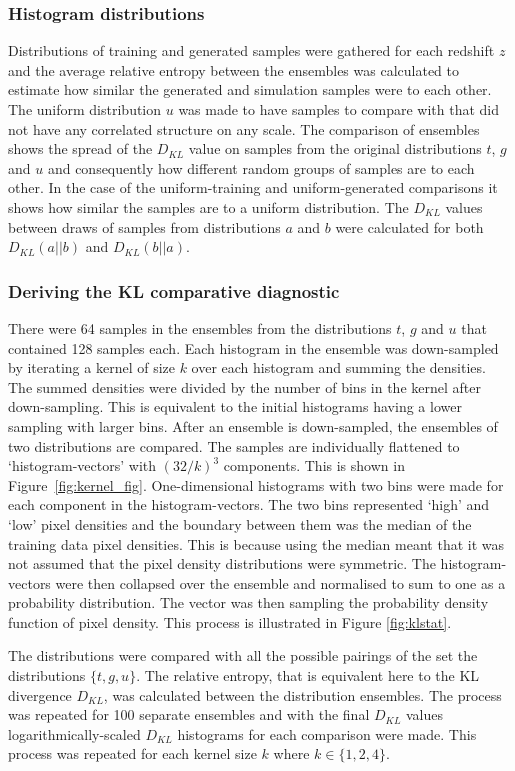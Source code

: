 \documentclass[twocolumn]{article}
\numberwithin{equation}{section}
\begin{document}
\subsubsection{Histogram distributions}
Distributions of training and generated samples were gathered for each redshift $z$ and the average relative entropy between the ensembles was calculated to estimate how similar the generated and simulation samples were to each other. The uniform distribution $u$ was made to have samples to compare with that did not have any correlated structure on any scale. The comparison of ensembles shows the spread of the $D_{KL}$ value on samples from the original distributions $t$, $g$ and $u$ and consequently how different random groups of samples are to each other. In the case of the uniform-training and uniform-generated comparisons it shows how similar the samples are to a uniform distribution. The $D_{KL}$ values between draws of samples from distributions $a$ and $b$ were calculated for both $D_{KL}(a||b)$ and $D_{KL}(b||a)$. 

\subsubsection{Deriving the KL comparative diagnostic}
There were 64 samples in the ensembles from the distributions $t$, $g$ and $u$ that contained 128 samples each. Each histogram in the ensemble was down-sampled by iterating a kernel of size $k$ over each histogram and summing the densities. The summed densities were divided by the number of bins in the kernel after down-sampling. This is equivalent to the initial histograms having a lower sampling with larger bins. After an ensemble is down-sampled, the ensembles of two distributions are compared. The samples are individually flattened to `histogram-vectors' with $(32/k)^3$ components. This is shown in Figure~\ref{fig:kernel_fig}. One-dimensional histograms with two bins were made for each component in the histogram-vectors. The two bins represented `high' and `low' pixel densities and the boundary between them was the median of the training data pixel densities. This is because using the median meant that it was not assumed that the pixel density distributions were symmetric. The histogram-vectors were then collapsed over the ensemble and normalised to sum to one as a probability distribution. The vector was then sampling the probability density function of pixel density. This process is illustrated in Figure \ref{fig:klstat}.

The distributions were compared with all the possible pairings of the set the distributions $\{ t, g, u\}$. The relative entropy, that is equivalent here to the KL divergence $D_{KL}$, was calculated between the distribution ensembles. The process was repeated for 100 separate ensembles and with the final $D_{KL}$ values logarithmically-scaled $D_{KL}$ histograms for each comparison were made. This process was repeated for each kernel size $k$ where $k \in \{1, 2, 4\}$.
\end{document}
